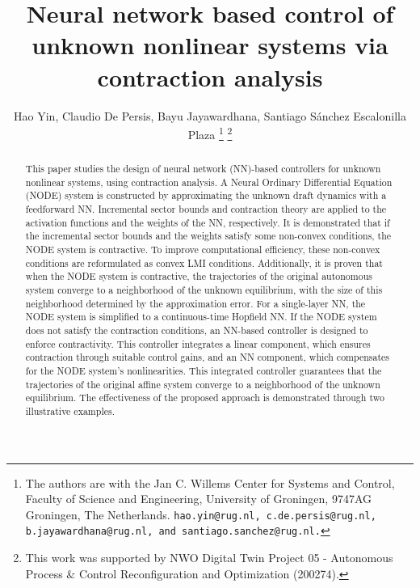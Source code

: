 \documentclass[journal,twoside,web]{ieeecolor}
\begin{document}
\title{Neural network based control of unknown nonlinear systems via contraction analysis}
\author{Hao Yin, Claudio De Persis, Bayu Jayawardhana, Santiago Sánchez Escalonilla Plaza 
\thanks{The authors are with the Jan C. Willems Center for Systems and Control, Faculty of Science and Engineering, University of Groningen, 9747AG Groningen, The Netherlands. {\tt\small hao.yin@rug.nl, c.de.persis@rug.nl, b.jayawardhana@rug.nl, and santiago.sanchez@rug.nl.}}
\thanks{This work was supported by NWO Digital Twin Project 05 - Autonomous Process $\&$ Control Reconfiguration and Optimization (200274).}}

\maketitle

\begin{abstract}
This paper studies the design of neural network (NN)-based controllers for unknown nonlinear systems, using contraction analysis. A Neural Ordinary Differential Equation (NODE) system is constructed by approximating the unknown draft dynamics with a feedforward NN. Incremental sector bounds and contraction theory are applied to the activation functions and the weights of the NN, respectively. It is demonstrated that if the incremental sector bounds and the weights satisfy some non-convex conditions, the NODE system is contractive. To improve computational efficiency, these non-convex conditions are reformulated as convex LMI conditions. Additionally, it is proven that when the NODE system is contractive, the trajectories of the original autonomous system converge to a neighborhood of the unknown equilibrium, with the size of this neighborhood determined by the approximation error. For a single-layer NN, the NODE system is simplified to a continuous-time Hopfield NN. If the NODE system does not satisfy the contraction conditions, an NN-based controller is designed to enforce contractivity. This controller integrates a linear component, which ensures contraction through suitable control gains, and an NN component, which compensates for the NODE system's nonlinearities. This integrated controller guarantees that the trajectories of the original affine system converge to a neighborhood of the unknown equilibrium. The effectiveness of the proposed approach is demonstrated through two illustrative examples.
\end{abstract}
\end{document}
